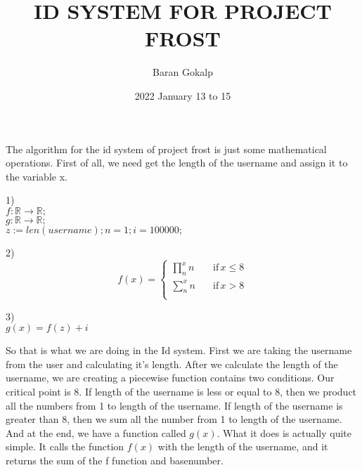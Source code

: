 \documentclass{article}
\title{ID SYSTEM FOR PROJECT FROST}
\author{Baran Gokalp}
\date{2022 January 13 to 15}
\newcommand\hr{\par\vspace{-.5\ht\strutbox}\noindent\hrulefill\par}
\begin{document}
    \maketitle
    The algorithm for the id system of project frost is just 
    some mathematical operations. First of all, we need get the 
    length of the username and assign it to the variable x.
    \hr
    \begin{center}
        1)\\
        $f:\mathbb{R} \longrightarrow \mathbb{R};$\\
        $g:\mathbb{R} \longrightarrow \mathbb{R};$\\
        $z:=len(username); n=1; i = 100000;$\\
        \hr  
        2)
        \begin{equation*}
            f(x)=\begin{cases}
                \prod_{n}^{x}n \quad &\text{if} \, x \leq 8 \\
                \sum_{n}^{x}n \quad &\text{if} \, x>8 \\
            \end{cases}
        \end{equation*}
        \hr
        3)\\
        $g(x) = f(z) + i$
    \end{center}
    \hr
    So that is what we are doing in the Id system. First we are 
    taking the username from the user and calculating it's length.
    After we calculate the length of the username, we are
    creating a piecewise function contains two conditions.
    Our critical point is 8. If length of the username is less 
    or equal to 8, then we product all the numbers 
    from 1 to length of the username. If length of the username
    is greater than 8, then we sum all the number from 1
    to length of the username. And at the end, 
    we have a function called $g(x)$. What it does is actually
    quite simple. It calls the function $f(x)$ with the length of
    the username, and it returns the sum of the f function and 
    basenumber.  
\end{document}
